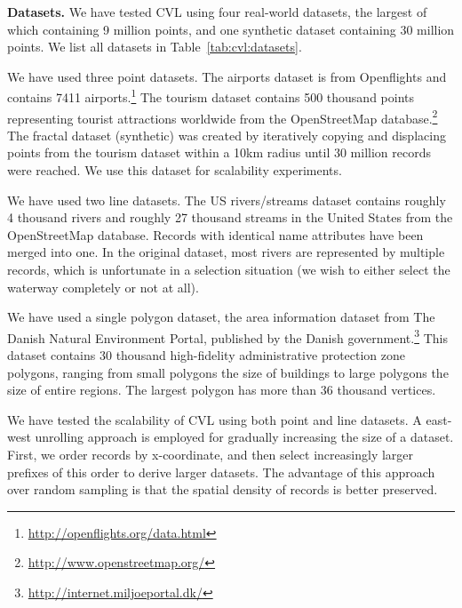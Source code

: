 \documentclass[11pt, oneside]{report}
\newcommand{\minisec}[1]{\noindent\textbf{#1.}}
\begin{document}
{\minisec{Datasets}
We have tested CVL using four real-world datasets, the largest of which containing 9 million points, and one synthetic dataset containing 30 million points. We list all datasets in Table~\ref{tab:cvl:datasets}. 

We have used three point datasets. The airports dataset is from Openflights and contains 7411 airports.\footnote{\url{http://openflights.org/data.html}} The tourism dataset contains 500 thousand points representing tourist attractions worldwide from the OpenStreetMap database.\footnote{\url{http://www.openstreetmap.org/}} The fractal dataset (synthetic) was created by iteratively copying and displacing points from the tourism dataset within a 10km radius until 30 million records were reached. We use this dataset for scalability experiments.

We have used two line datasets. The US rivers/streams dataset contains roughly 4 thousand rivers and roughly 27 thousand streams in the United States from the OpenStreetMap database. Records with identical name attributes have been merged into one. In the original dataset, most rivers are represented by multiple records, which is unfortunate in a selection situation (we wish to either select the waterway completely or not at all). 

We have used a single polygon dataset, the area information dataset from The Danish Natural Environment Portal, published by the Danish government.\footnote{\url{http://internet.miljoeportal.dk/}} This dataset contains 30 thousand high-fidelity administrative protection zone polygons, ranging from small polygons the size of buildings to large polygons the size of entire regions. The largest polygon has more than 36 thousand vertices.

We have tested the scalability of CVL using both point and line datasets. A east-west unrolling approach is employed for gradually increasing the size of a dataset. First, we order records by x-coordinate, and then select increasingly larger prefixes of this order to derive larger datasets. The advantage of this approach over random sampling is that the spatial density of records is better preserved.

}
\end{document}
